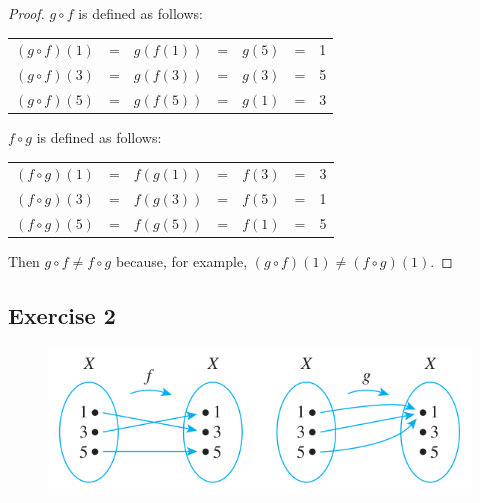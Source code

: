 \documentclass[14pt]{extarticle}
\begin{document}
\begin{proof}
\(g \circ f\) is defined as follows:
\begin{center}
\begin{tabular}{ccccccc}
\((g \circ f)(1)\) & = & \(g(f(1))\) & = & \(g(5)\) & = & 1\\
\((g \circ f)(3)\) & = & \(g(f(3))\) & = & \(g(3)\) & = & 5\\
\((g \circ f)(5)\) & = & \(g(f(5))\) & = & \(g(1)\) & = & 3\\
\end{tabular}
\end{center}

\(f \circ g\) is defined as follows:
\begin{center}
\begin{tabular}{ccccccc}
\((f \circ g)(1)\) & = & \(f(g(1))\) & = & \(f(3)\) & = & 3 \\
\((f \circ g)(3)\) & = & \(f(g(3))\) & = & \(f(5)\) & = & 1 \\
\((f \circ g)(5)\) & = & \(f(g(5))\) & = & \(f(1)\) & = & 5 \\
\end{tabular}
\end{center}

Then \(g \circ f \neq f \circ g\) because, for example, \((g \circ f)(1) \neq (f \circ g)(1)\).
\end{proof}

\subsection{Exercise 2}
\begin{figure}[ht!]
\centering
\includegraphics[scale=0.5]{../images/7.3.2.png}
\end{figure}
\end{document}
